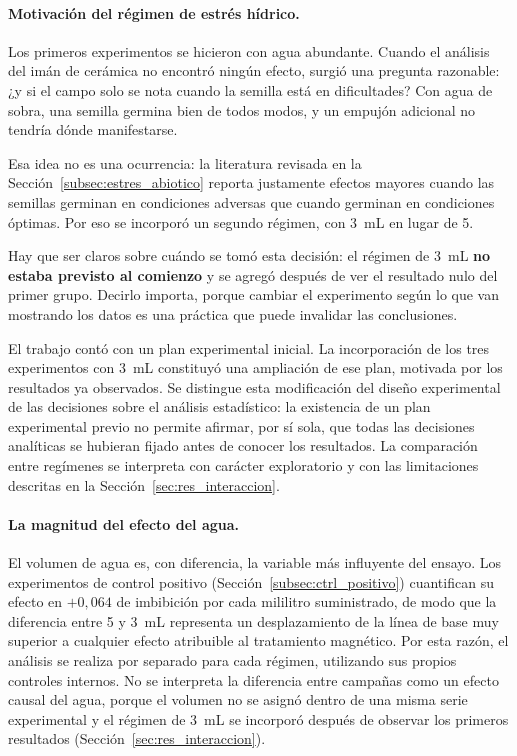 \paragraph{Motivación del régimen de estrés hídrico.}

Los primeros experimentos se hicieron con agua abundante. Cuando el análisis del imán de cerámica no encontró ningún efecto, surgió una pregunta razonable: ¿y si el campo solo se nota cuando la semilla está en dificultades? Con agua de sobra, una semilla germina bien de todos modos, y un empujón adicional no tendría dónde manifestarse.

Esa idea no es una ocurrencia: la literatura revisada en la Sección~\ref{subsec:estres_abiotico} reporta justamente efectos mayores cuando las semillas germinan en condiciones adversas que cuando germinan en condiciones óptimas. Por eso se incorporó un segundo régimen, con 3~mL en lugar de 5.

Hay que ser claros sobre cuándo se tomó esta decisión: el régimen de 3~mL \textbf{no estaba previsto al comienzo} y se agregó después de ver el resultado nulo del primer grupo. Decirlo importa, porque cambiar el experimento según lo que van mostrando los datos es una práctica que puede invalidar las conclusiones.

El trabajo contó con un plan experimental inicial. La incorporación de los tres experimentos con 3~mL constituyó una ampliación de ese plan, motivada por los resultados ya observados. Se distingue esta modificación del diseño experimental de las decisiones sobre el análisis estadístico: la existencia de un plan experimental previo no permite afirmar, por sí sola, que todas las decisiones analíticas se hubieran fijado antes de conocer los resultados. La comparación entre regímenes se interpreta con carácter exploratorio y con las limitaciones descritas en la Sección~\ref{sec:res_interaccion}.

\paragraph{La magnitud del efecto del agua.}

El volumen de agua es, con diferencia, la variable más influyente del ensayo. Los experimentos de control positivo (Sección~\ref{subsec:ctrl_positivo}) cuantifican su efecto en \(+0{,}064\) de imbibición por cada mililitro suministrado, de modo que la diferencia entre 5 y 3~mL representa un desplazamiento de la línea de base muy superior a cualquier efecto atribuible al tratamiento magnético. Por esta razón, el análisis se realiza por separado para cada régimen, utilizando sus propios controles internos. No se interpreta la diferencia entre campañas como un efecto causal del agua, porque el volumen no se asignó dentro de una misma serie experimental y el régimen de 3~mL se incorporó después de observar los primeros resultados (Sección~\ref{sec:res_interaccion}).

